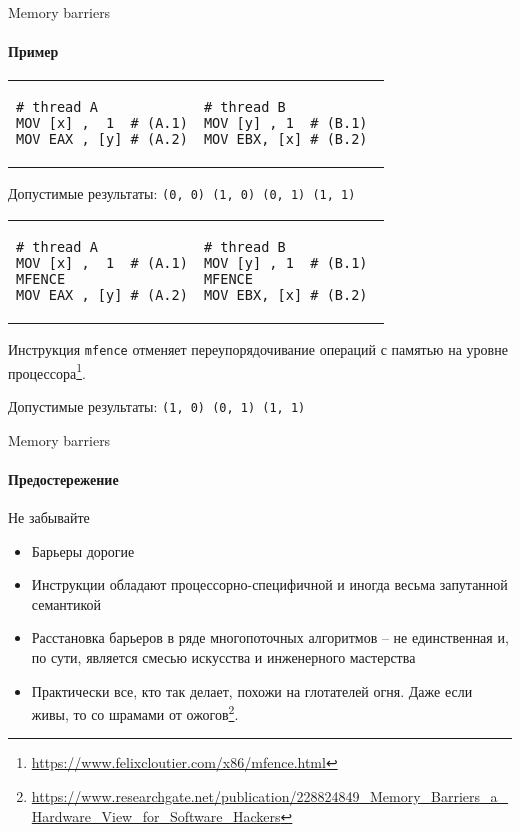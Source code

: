 \begin{frame}[fragile]{Memory barriers}
\framesubtitle{Пример}

\vspace{-0.5cm}

\begin{tabular}{p{} p{}}
\begin{verbatim}
# thread A
MOV [x] ,  1  # (A.1)
MOV EAX , [y] # (A.2)
\end{verbatim}

& 

\begin{verbatim}
# thread B          
MOV [y] , 1  # (B.1) 
MOV EBX, [x] # (B.2) 
\end{verbatim}
\end{tabular}

Допустимые результаты: 
\pause 
\texttt{(0, 0) (1, 0) (0, 1) (1, 1)}

\pause
\vspace{-0.25cm}

\begin{tabular}{p{} p{}}
\begin{verbatim}
# thread A
MOV [x] ,  1  # (A.1)
MFENCE
MOV EAX , [y] # (A.2)
\end{verbatim}

& 

\begin{verbatim}
# thread B          
MOV [y] , 1  # (B.1) 
MFENCE
MOV EBX, [x] # (B.2) 
\end{verbatim}
\end{tabular}

\pause
Инструкция \texttt{mfence} отменяет переупорядочивание операций с памятью на уровне процессора\footnote<4->{\tiny\url{https://www.felixcloutier.com/x86/mfence.html}}.

\pause

Допустимые результаты: \pause \texttt{(1, 0) (0, 1) (1, 1)}
\end{frame}


\begin{frame}{Memory barriers}
\framesubtitle{Предостережение}

Не забывайте
\begin{itemize}
  \pause
  \item Барьеры дорогие

  \pause
  \item Инструкции обладают процессорно-специфичной и иногда весьма запутанной семантикой

  \pause
  \item Расстановка барьеров в ряде многопоточных алгоритмов -- не единственная и, по сути, является смесью искусства и инженерного мастерства

  \pause
  \item Практически все, кто так делает, похожи на глотателей огня. Даже если живы, то со шрамами от ожогов\footnote<5->{\tiny\url{https://www.researchgate.net/publication/228824849_Memory_Barriers_a_Hardware_View_for_Software_Hackers}}.
\end{itemize}
\end{frame}


